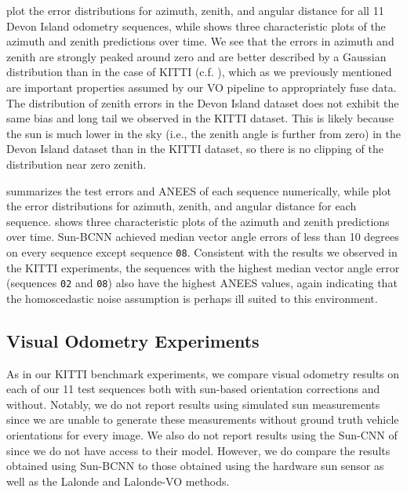  plot the error distributions for azimuth, zenith, and angular distance for all 11 Devon Island odometry sequences, while  shows three characteristic plots of the azimuth and zenith predictions over time. 
We see that the errors in azimuth and zenith are strongly peaked around zero and are better described by a Gaussian distribution than in the case of KITTI (c.f. ), which as we previously mentioned are important properties assumed by our VO pipeline to appropriately fuse data.
The distribution of zenith errors in the Devon Island dataset does not exhibit the same bias and long tail we observed in the KITTI dataset. 
This is likely because the sun is much lower in the sky (i.e., the zenith angle is further from zero) in the Devon Island dataset than in the KITTI dataset, so there is no clipping of the distribution near zero zenith.

 summarizes the test errors and ANEES of each sequence numerically, while  plot the error distributions for azimuth, zenith, and angular distance for each sequence. 
 shows three characteristic plots of the azimuth and zenith predictions over time. 
Sun-BCNN achieved median vector angle errors of less than 10 degrees on every sequence except sequence \texttt{08}.
Consistent with the results we observed in the KITTI experiments, the sequences with the highest median vector angle error (sequences \texttt{02} and \texttt{08}) also have the highest ANEES values, again indicating that the homoscedastic noise assumption is perhaps ill suited to this environment.


\subsection{Visual Odometry Experiments}
As in our KITTI benchmark experiments, we compare visual odometry results on each of our 11 test sequences both with sun-based orientation corrections and without.
Notably, we do not report results using simulated sun measurements since we are unable to generate these measurements without ground truth vehicle orientations for every image.
We also do not report results using the Sun-CNN of \citet{Ma2016-at} since we do not have access to their model.
However, we do compare the results obtained using Sun-BCNN to those obtained using the hardware sun sensor as well as the Lalonde \citep{Lalonde2011-jw} and Lalonde-VO \citep{Clement2016-ir} methods.

